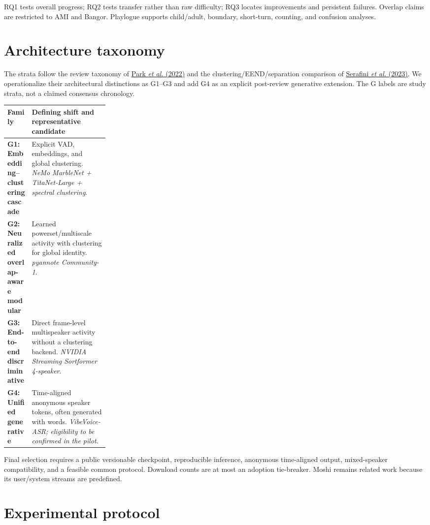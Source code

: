 \documentclass[9pt]{extarticle}
\begin{document}
\begin{multicols}{2}
RQ1 tests overall progress; RQ2 tests transfer rather than raw difficulty; RQ3
locates improvements and persistent failures. Overlap claims are restricted to
AMI and Bangor. Playlogue supports child/adult, boundary, short-turn, counting,
and confusion analyses.

\columnbreak

\section*{Architecture taxonomy}

The strata follow the review taxonomy of
\href{https://doi.org/10.1016/j.csl.2021.101317}{Park \emph{et al.} (2022)}
and the clustering/EEND/separation comparison of
\href{https://doi.org/10.1016/j.csl.2023.101534}{Serafini \emph{et al.}
(2023)}. We operationalize their architectural distinctions as G1--G3 and add
G4 as an explicit post-review generative extension. The G labels are study
strata, not a claimed consensus chronology.

{\fontsize{7.0}{8.0}\selectfont
\begin{tabularx}{\linewidth}{@{}>{\bfseries}p{0.24\linewidth}Y@{}}
\toprule
Family & Defining shift and representative candidate \\
\midrule
G1: Embedding--clustering cascade & Explicit VAD, embeddings, and global
clustering. \emph{NeMo MarbleNet + TitaNet-Large + spectral clustering}. \\
G2: Neuralized overlap-aware modular & Learned powerset/multiscale activity
with clustering for global identity. \emph{pyannote Community-1}. \\
G3: End-to-end discriminative & Direct frame-level multispeaker activity
without a clustering backend. \emph{NVIDIA Streaming Sortformer 4-speaker}. \\
G4: Unified generative & Time-aligned anonymous speaker tokens, often generated
with words. \emph{VibeVoice-ASR; eligibility to be confirmed in the pilot}. \\
\bottomrule
\end{tabularx}}

Final selection requires a public versionable checkpoint, reproducible
inference, anonymous time-aligned output, mixed-speaker compatibility, and a
feasible common protocol. Download counts are at most an adoption tie-breaker.
Moshi remains related work because its user/system streams are predefined.

\section*{Experimental protocol}


\end{multicols}
\end{document}
